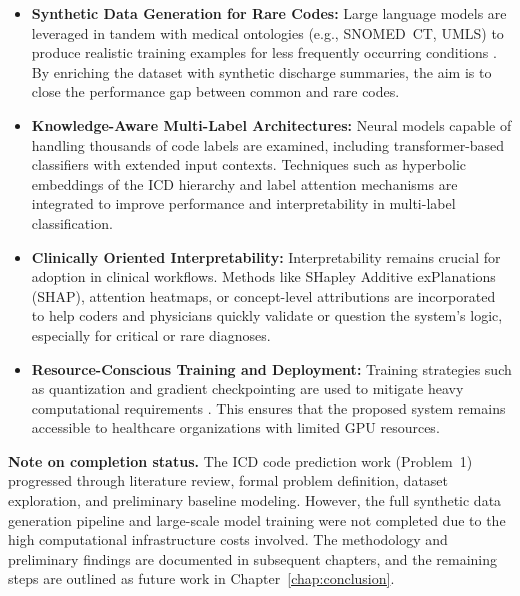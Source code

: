 \begin{itemize}
    \item \textbf{Synthetic Data Generation for Rare Codes:} Large language models are leveraged in tandem with medical ontologies (e.g., SNOMED~CT, UMLS) to produce realistic training examples for less frequently occurring conditions \citep{kumichev2024medsyn,falis2022horsestozebras}. By enriching the dataset with synthetic discharge summaries, the aim is to close the performance gap between common and rare codes.

    \item \textbf{Knowledge-Aware Multi-Label Architectures:} Neural models capable of handling thousands of code labels are examined, including transformer-based classifiers with extended input contexts. Techniques such as hyperbolic embeddings of the ICD hierarchy \citep{nickel2017poincare,cao2020hypercore} and label attention mechanisms \citep{vu2020ijcai} are integrated to improve performance and interpretability in multi-label classification.

    \item \textbf{Clinically Oriented Interpretability:} Interpretability remains crucial for adoption in clinical workflows. Methods like SHapley Additive exPlanations (SHAP), attention heatmaps, or concept-level attributions \citep{holzinger2017we,teng2020explainable} are incorporated to help coders and physicians quickly validate or question the system's logic, especially for critical or rare diagnoses.

    \item \textbf{Resource-Conscious Training and Deployment:} Training strategies such as quantization and gradient checkpointing are used to mitigate heavy computational requirements \citep{geiping2023cramming}. This ensures that the proposed system remains accessible to healthcare organizations with limited GPU resources.
\end{itemize}

\noindent\textbf{Note on completion status.} The ICD code prediction work (Problem~1) progressed through literature review, formal problem definition, dataset exploration, and preliminary baseline modeling. However, the full synthetic data generation pipeline and large-scale model training were not completed due to the high computational infrastructure costs involved. The methodology and preliminary findings are documented in subsequent chapters, and the remaining steps are outlined as future work in Chapter~\ref{chap:conclusion}.

